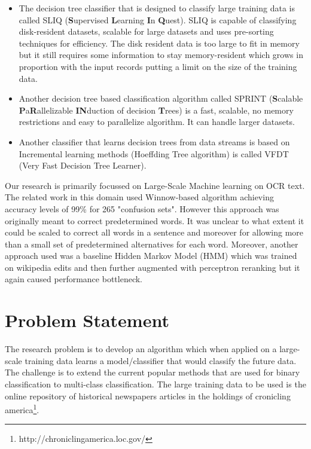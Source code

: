\documentclass{article}
\begin{document}
\begin{itemize}
    \item The decision tree classifier that is designed to classify large training data is called SLIQ (\textbf{S}upervised \textbf{L}earning \textbf{I}n \textbf{Q}uest). SLIQ is capable of classifying disk-resident datasets, scalable for large datasets and uses pre-sorting techniques for efficiency. The disk resident data is too large to fit in memory but it still requires some information to stay memory-resident which grows in proportion with the input records putting a limit on the size of the training data.
\item Another decision tree based classification algorithm called SPRINT (\textbf{S}calable \textbf{P}a\textbf{R}allelizable \textbf{IN}duction of decision \textbf{T}rees) is a fast, scalable, no memory restrictions and easy to parallelize algorithm. It can handle larger datasets.
\item Another classifier that learns decision trees from data streams is based on Incremental learning methods (Hoeffding Tree algorithm) is called VFDT (Very Fast Decision Tree Learner).
\end{itemize}
Our research is primarily focussed on Large-Scale Machine learning on OCR text.
The related work in this domain used Winnow-based algorithm \cite{winnow} achieving accuracy levels of 99\% for 265 "confusion sets". However this approach was originally meant to correct predetermined words. It was unclear to what extent it could be scaled to correct all words in a sentence and moreover for allowing more than a small set of predetermined alternatives for each word.
Moreover, another approach used was a baseline Hidden Markov Model (HMM) which was trained on wikipedia edits and then further augmented with perceptron reranking but it again caused performance bottleneck.
\section{Problem Statement}
The research problem is to develop an algorithm which when applied on a large-scale training data learns a model/classifier that would classify the future data. The challenge is to extend the current popular methods that are used for binary classification to multi-class classification.
The large training data to be used is the online repository of historical newspapers articles in the holdings of cronicling america\footnote{http://chroniclingamerica.loc.gov/}.
 
\end{document}
